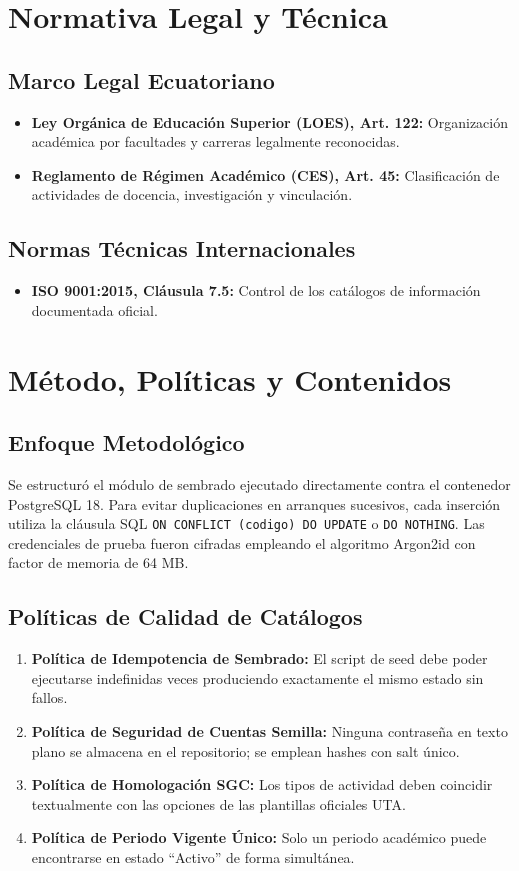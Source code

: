\documentclass[12pt,a4paper]{article}
\begin{document}
\section{Normativa Legal y Técnica}
\subsection{Marco Legal Ecuatoriano}
\begin{itemize}[leftmargin=1.5em, itemsep=2pt]
    \item \textbf{Ley Orgánica de Educación Superior (LOES), Art. 122:} Organización académica por facultades y carreras legalmente reconocidas.
    \item \textbf{Reglamento de Régimen Académico (CES), Art. 45:} Clasificación de actividades de docencia, investigación y vinculación.
\end{itemize}
\subsection{Normas Técnicas Internacionales}
\begin{itemize}[leftmargin=1.5em, itemsep=2pt]
    \item \textbf{ISO 9001:2015, Cláusula 7.5:} Control de los catálogos de información documentada oficial.
\end{itemize}

\section{Método, Políticas y Contenidos}
\subsection{Enfoque Metodológico}
Se estructuró el módulo de sembrado ejecutado directamente contra el contenedor PostgreSQL 18. Para evitar duplicaciones en arranques sucesivos, cada inserción utiliza la cláusula SQL \texttt{ON CONFLICT (codigo) DO UPDATE} o \texttt{DO NOTHING}. Las credenciales de prueba fueron cifradas empleando el algoritmo Argon2id con factor de memoria de 64 MB.

\subsection{Políticas de Calidad de Catálogos}
\begin{enumerate}[leftmargin=1.5em, itemsep=2pt]
    \item \textbf{Política de Idempotencia de Sembrado:} El script de seed debe poder ejecutarse indefinidas veces produciendo exactamente el mismo estado sin fallos.
    \item \textbf{Política de Seguridad de Cuentas Semilla:} Ninguna contraseña en texto plano se almacena en el repositorio; se emplean hashes con salt único.
    \item \textbf{Política de Homologación SGC:} Los tipos de actividad deben coincidir textualmente con las opciones de las plantillas oficiales UTA.
    \item \textbf{Política de Periodo Vigente Único:} Solo un periodo académico puede encontrarse en estado ``Activo'' de forma simultánea.
\end{enumerate}
\end{document}
